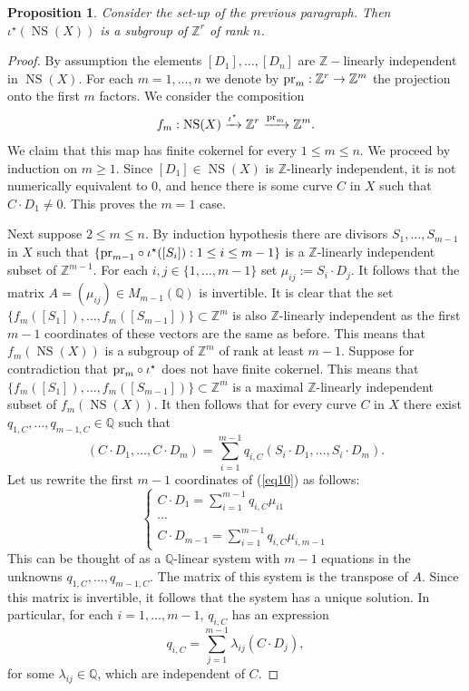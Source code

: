 \documentclass[12pt]{amsart}
\newtheorem{prop}[prop]{Proposition}
\theoremstyle{remark}
\newcommand{\Q}{{\mathbb Q}}
\newcommand{\Z}{{\mathbb Z}}
\renewcommand{\1}{{\mathbb{S}}}
\newcommand{\NS}{{\operatorname{NS}}}
\newcommand{\<}{\langle}
\renewcommand{\>}{\rangle}
\newcommand{\pr}{{\rm{pr}}}
\begin{document}
\begin{prop}\label{prop:NSXcomputations} Consider the set-up of the previous paragraph. Then $\iota^\star(\NS(X))$ is a subgroup of $\Z^r$ of rank $n$. 
\end{prop}
\begin{proof} 
By assumption the elements $[D_1],\ldots, [D_n]$ are $\Z-$linearly independent in $\NS(X)$. For each $m=1,\ldots, n$ we denote by $\pr_m:\Z^r\to\Z^m$ the projection onto the first $m$ factors. We consider the composition 
\[f_m:\NS(X)\xrightarrow{\iota^\star}\Z^r\xrightarrow{\pr_m}\Z^m.\]
We claim that this map has finite cokernel for every $1\leq m\leq n$. 
We proceed by induction on $m\geq 1$. Since $[D_1]\in \NS(X)$ is $\Z$-linearly independent, it is not numerically equivalent to $0$, and hence there is some curve $C$ in $X$ such that $C\cdot D_1\neq 0$. This proves the $m=1$ case. 

Next suppose $2\leq m\leq n$. By induction hypothesis there are divisors $S_1,\ldots, S_{m-1}$ in $X$ such that $\{\pr_{m-1}\circ\iota^\star([S_i]):1\leq i\leq m-1\}$ is a $\Z$-linearly independent subset of $\Z^{m-1}$. For each $i, j\in\{1,\ldots, m-1\}$ set $\mu_{ij}:=S_i\cdot D_j$. It follows that the matrix $A=(\mu_{ij})\in M_{m-1}(\Q)$ is invertible. It is clear that the set $\{f_{m}([S_1]),\ldots, f_{m}([S_{m-1}])\}\subset\Z^{m}$ is also $\Z$-linearly independent as the first $m-1$ coordinates of these vectors are the same as before. This means that $f_m(\NS(X))$ is a subgroup of $\Z^m$ of rank at least $m-1$. Suppose for contradiction that $\pr_m\circ\iota^\star$ does not have finite cokernel. This means that $\{f_{m}([S_1]),\ldots, f_{m}([S_{m-1}])\}\subset\Z^{m}$ is a maximal $\Z$-linearly independent subset of $f_m(\NS(X))$. It then follows that for every curve $C$ in $X$ there exist $q_{1,C},\ldots, q_{m-1,C}\in\Q$ such that 
\begin{equation}\label{eq10}
    (C\cdot D_1,\ldots, C\cdot D_m)=\sum_{i=1}^{m-1} q_{i,C}(S_i\cdot D_1,\ldots, S_i\cdot D_m).
\end{equation}
Let us rewrite the first $m-1$ coordinates of (\ref{eq10}) as follows: 
\[
\left\{\begin{array}{c}
    C\cdot D_1=\sum_{i=1}^{m-1} q_{i,C}\mu_{i1}   \\
     \cdots\\
     C\cdot D_{m-1}=\sum_{i=1}^{m-1} q_{i,C}\mu_{i,m-1}
\end{array}\right.
\] This can be thought of as a $\Q$-linear system with $m-1$ equations in the unknowns $q_{1,C},\ldots, q_{m-1,C}$. The matrix of this system is the transpose of $A$. Since this matrix is invertible, it follows that the system has a unique solution. In particular, for each $i=1,\ldots, m-1$, $q_{i,C}$ has an expression 
\begin{equation}
    q_{i,C}=\sum_{j=1}^{m-1}\lambda_{ij} (C\cdot D_j),
\end{equation} for some $\lambda_{ij}\in\Q$, which are independent of $C$. 


\end{proof}
\end{document}
